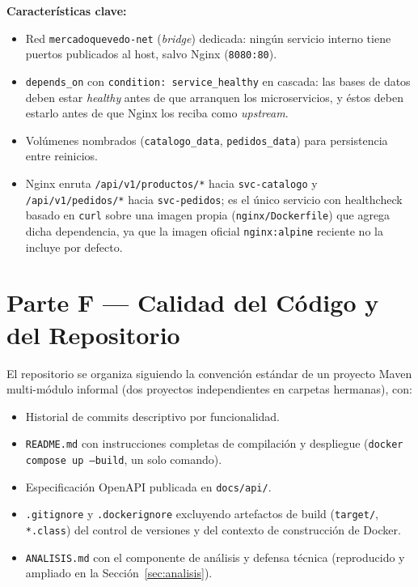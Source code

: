 \documentclass[11pt,a4paper]{article}
\begin{document}
\textbf{Características clave:}
\begin{itemize}[leftmargin=2em]
    \item Red \texttt{mercadoquevedo-net} (\emph{bridge}) dedicada: ningún
    servicio interno tiene puertos publicados al host, salvo Nginx
    (\texttt{8080:80}).
    \item \texttt{depends\_on} con \texttt{condition: service\_healthy} en
    cascada: las bases de datos deben estar \emph{healthy} antes de que
    arranquen los microservicios, y éstos deben estarlo antes de que Nginx los
    reciba como \emph{upstream}.
    \item Volúmenes nombrados (\texttt{catalogo\_data}, \texttt{pedidos\_data})
    para persistencia entre reinicios.
    \item Nginx enruta \texttt{/api/v1/productos/*} hacia \texttt{svc-catalogo}
    y \texttt{/api/v1/pedidos/*} hacia \texttt{svc-pedidos}; es el único
    servicio con healthcheck basado en \texttt{curl} sobre una imagen propia
    (\texttt{nginx/Dockerfile}) que agrega dicha dependencia, ya que la imagen
    oficial \texttt{nginx:alpine} reciente no la incluye por defecto.
\end{itemize}

\section{Parte F — Calidad del Código y del Repositorio}

El repositorio se organiza siguiendo la convención estándar de un proyecto
Maven multi-módulo informal (dos proyectos independientes en carpetas
hermanas), con:

\begin{itemize}[leftmargin=2em]
    \item Historial de commits descriptivo por funcionalidad.
    \item \texttt{README.md} con instrucciones completas de compilación y
    despliegue (\texttt{docker compose up --build}, un solo comando).
    \item Especificación OpenAPI publicada en \texttt{docs/api/}.
    \item \texttt{.gitignore} y \texttt{.dockerignore} excluyendo artefactos
    de build (\texttt{target/}, \texttt{*.class}) del control de versiones y
    del contexto de construcción de Docker.
    \item \texttt{ANALISIS.md} con el componente de análisis y defensa técnica
    (reproducido y ampliado en la Sección~\ref{sec:analisis}).
\end{itemize}
\end{document}
